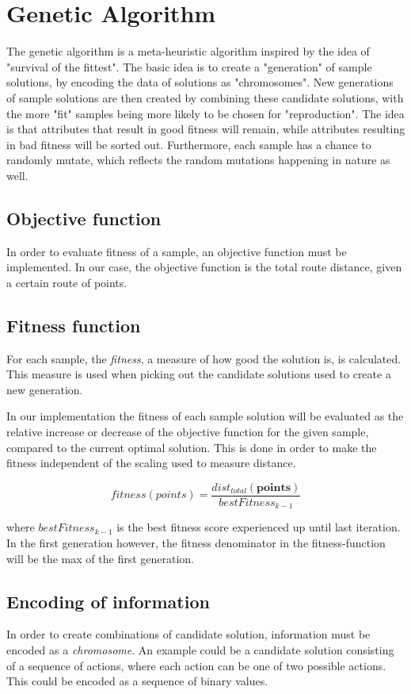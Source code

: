 \section{Genetic Algorithm}
The genetic algorithm is a meta-heuristic algorithm inspired by the idea of "survival of the fittest". The basic idea is to create a "generation" of sample solutions, by encoding the data of solutions as "chromosomes". New generations of sample solutions are then created by combining these candidate solutions, with the more "fit" samples being more likely to be chosen for "reproduction". The idea is that attributes that result in good fitness will remain, while attributes resulting in bad fitness will be sorted out. Furthermore, each sample has a chance to randomly mutate, which reflects the random mutations happening in nature as well.

\subsection{Objective function}
In order to evaluate fitness of a sample, an objective function must be implemented. In our case, the objective function is the total route distance, given a certain route of points.

\subsection{Fitness function}
For each sample, the \textit{fitness}, a measure of how good the solution is, is calculated. This measure is used when picking out the candidate solutions used to create a new generation.

In our implementation the fitness of each sample solution will be evaluated as the relative increase or decrease of the objective function for the given sample, compared to the current optimal solution. This is done in order to make the fitness independent of the scaling used to measure distance.

\begin{equation}
	fitness(points) = \frac{dist_{total}(\textbf{points})}{bestFitness_{k-1}}
\end{equation}

where $bestFitness_{k-1}$ is the best fitness score experienced up until last iteration. In the first generation however, the fitness denominator in the fitness-function will be the max of the first generation.

\subsection{Encoding of information}
In order to create combinations of candidate solution, information must be encoded as a \textit{chromosome}. An example could be a candidate solution consisting of a sequence of actions, where each action can be one of two possible actions. This could be encoded as a sequence of binary values.

